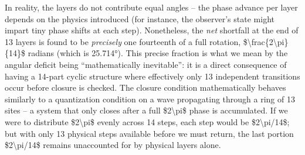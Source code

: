 \documentclass[
]{article}
\begin{document}
In reality, the layers do not contribute equal angles -- the phase
advance per layer depends on the physics introduced (for instance, the
observer's state might impart tiny phase shifts at each
step\hspace{0pt}). Nonetheless, the \emph{net} shortfall at the end of
13 layers is found to be \emph{precisely} one fourteenth of a full
rotation, \$\textbackslash frac\{2\textbackslash pi\}\{14\}\$ radians
(which is 25.714°). This precise fraction is what we mean by the angular
deficit being ``mathematically inevitable'': it is a direct consequence
of having a 14-part cyclic structure where effectively only 13
independent transitions occur before closure is checked. The closure
condition mathematically behaves similarly to a quantization condition
on a wave propagating through a ring of 13 sites -- a system that only
closes after a full \$2\textbackslash pi\$ phase is
accumulated\hspace{0pt}. If we were to distribute \$2\textbackslash pi\$
evenly across 14 steps, each step would be \$2\textbackslash pi/14\$;
but with only 13 physical steps available before we must return, the
last portion \$2\textbackslash pi/14\$ remains unaccounted for by
physical layers alone.
\end{document}
